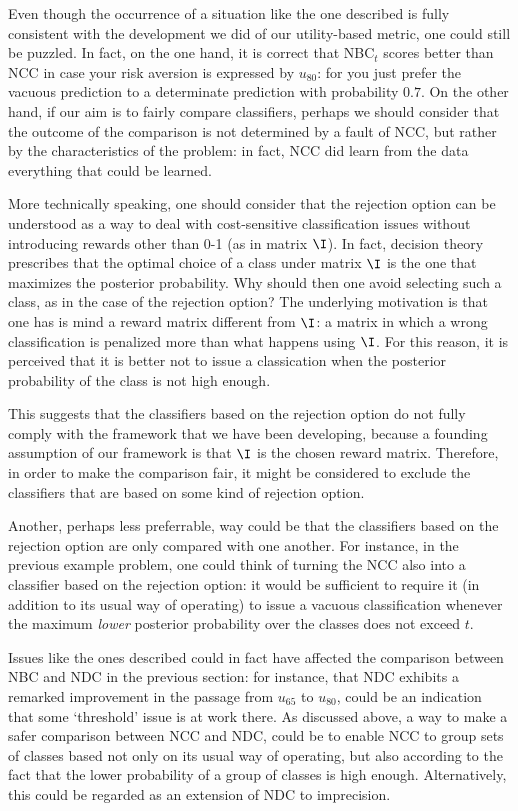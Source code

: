 \documentclass[a4paper,10pt,reqno]{amsart}
\theoremstyle{remark}
\begin{document}
Even though the occurrence of a situation like the one described is fully consistent with the development we did of our utility-based metric, one could still be puzzled. In fact, on the one hand, it is correct that NBC$_t$ scores better than NCC in case your risk aversion is expressed by $u_{80}$: for you just prefer the vacuous prediction to a determinate prediction with probability $0.7$. On the other hand, if our aim is to fairly compare classifiers, perhaps we should consider that the outcome of the comparison is not determined by a fault of NCC, but rather by the characteristics of the problem: in fact, NCC did learn from the data everything that could be learned. 

More technically speaking, one should consider that the rejection option can be understood as a way to deal with cost-sensitive classification issues without introducing rewards other than 0-1 (as in matrix $\I$). In fact, decision theory prescribes that the optimal choice of a class under matrix $\I$ is the one that maximizes the posterior probability. Why should then one avoid selecting such a class, as in the case of the rejection option? The underlying motivation is that one has is mind a reward matrix different from $\I$: a matrix in which a wrong classification is penalized more than what happens using $\I$. For this reason, it is perceived that it is better not to issue a classication when the posterior probability of the class is not high enough.

This suggests that the classifiers based on the rejection option do not fully comply with the framework that we have been developing, because a founding assumption of our framework is that $\I$ is the chosen reward matrix. Therefore, in order to make the comparison fair, it might be considered to exclude the classifiers that are based on some kind of rejection option. 

Another, perhaps less preferrable, way could be that the classifiers based on the rejection option are only compared with one another. For instance, in the previous example problem, one could think of turning the NCC also into a classifier based on the rejection option: it would be sufficient to  require it (in addition to its usual way of operating) to issue a vacuous classification whenever the maximum \emph{lower} posterior probability over the classes does not exceed $t$.

Issues like the ones described could in fact have affected the comparison between NBC and NDC in the previous section: for instance, that NDC exhibits a remarked improvement in the passage from $u_{65}$ to $u_{80}$, could be an indication that some `threshold' issue is at work there. As discussed above, a way to make a safer comparison between NCC and NDC, could be to enable NCC to group sets of classes based not only on its usual way of operating, but also according to the fact that the lower probability of a group of classes is high enough. Alternatively, this could be regarded as an extension of NDC to imprecision.
\end{document}
